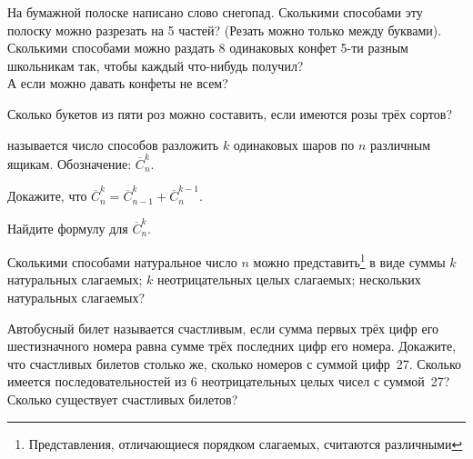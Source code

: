 \documentclass[a4paper,12pt]{article}\usepackage{newlistok}
\begin{document}


 На бумажной полоске написано слово  снегопад. Сколькими
способами эту полоску можно разрезать на 5 частей?
(Резать можно только между буквами).
\\ Сколькими способами можно раздать 8 одинаковых конфет
5-ти разным школьникам так, чтобы каждый что-нибудь получил?
\\ А если можно давать конфеты не всем?

Сколько букетов из пяти роз можно составить, если имеются розы трёх сортов?


 
называется число способов разложить $k$ одинаковых шаров по $n$
различным ящикам. Обозначение: $\overline C^k_n$.

\noindent\parbox{10cm}{
 Докажите, что
$\overline C^k_n=\overline C^k_{n-1}+\overline C^{k-1}_n$.
}
\qquad
\parbox{8cm}{
Найдите формулу для $\overline C^k_n$.
}

 Сколькими способами натуральное число $n$ можно
представить\footnote[1]{
Представления, отличающиеся  порядком слагаемых,
считаются раз\-лич\-ны\-ми} в виде суммы%
 $k$ натуральных слагаемых;
 $k$ неотрицательных целых слагаемых;%
 нескольких натуральных слагаемых?

 Автобусный билет называется счастливым,  если сумма первых трёх
цифр его шестизначного номера равна сумме трёх последних цифр его номера.
 Докажите, что счастливых билетов столько же, сколько номеров с суммой
цифр~27.
 Сколько имеется последовательностей из 6 неотрицательных целых чисел
с суммой~27?
 Сколько существует счастливых билетов?







\end{document}
